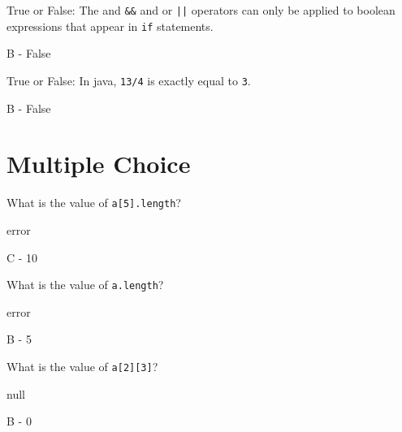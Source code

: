 \documentclass[11pt,answers]{exam}
\begin{document}
\begin{questions}
\question[1] True or False: The and {\tt \&\&} and or {\tt ||} operators can only be applied to boolean expressions that appear in {\tt if} statements.
\begin{solution} B - False \end{solution}

\question[1] True or False: In java, {\tt 13/4} is exactly equal to {\tt 3}.
\begin{solution} B - False \end{solution}

\newpage
\section*{Multiple Choice}


\question[1] What is the value of {\tt a[5].length}? \newline
\begin{oneparchoices}
    \choice error	
\end{oneparchoices}
\begin{solution}
	C - 10
\end{solution}

\question[1] What is the value of {\tt a.length}? \newline
\begin{oneparchoices}
    \choice error	
\end{oneparchoices}
\begin{solution}
	B - 5
\end{solution}

\question[1] What is the value of {\tt a[2][3]}? \newline
\begin{oneparchoices}
    \choice null	
\end{oneparchoices}
\begin{solution}
	B - 0
\end{solution}


\end{questions}
\end{document}
